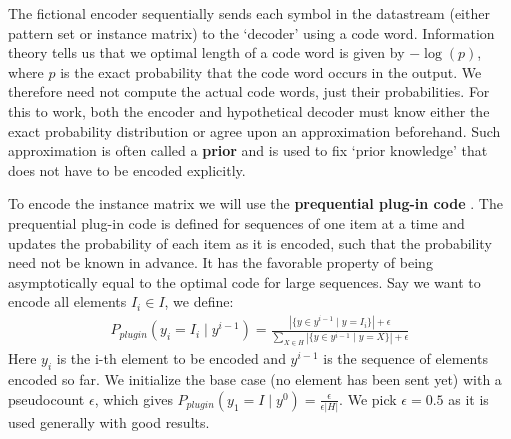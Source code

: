 \documentclass{llncs}
\begin{document}

The fictional encoder sequentially sends each symbol in the datastream (either pattern set or instance matrix) to the `decoder' using a code word. Information theory tells us that we optimal length of a code word is given by $-\log(p)$, where $p$ is the exact probability that the code word occurs in the output. We therefore need not compute the actual code words, just their probabilities. For this to work, both the encoder and hypothetical decoder must know either the exact probability distribution or agree upon an approximation beforehand. Such approximation is often called a \textbf{prior} and is used to fix `prior knowledge' that does not have to be encoded explicitly. 


To encode the instance matrix we will use the \textbf{prequential plug-in code} \cite{ppcode}. The prequential plug-in code is defined for sequences of one item at a time and updates the probability of each item as it is encoded, such that the probability need not be known in advance. It has the favorable property of being asymptotically equal to the optimal code for large sequences. Say we want to encode all elements ${I}_i \in {I}$, we define:
\label{plugin}
\begin{align*}
P_{plugin}( y_i = {I}_i \mid y^{i-1} ) = \frac{|\{y \in y^{i-1} \mid y = {I}_i\}| + \epsilon }{\sum_{X \in H}|\{y \in y^{i-1} \mid y = X\}| + \epsilon}
\end{align*}
Here $y_i$ is the i-th element to be encoded and $y^{i-1}$ is the sequence of elements encoded so far. We initialize the base case (no element has been sent yet) with a pseudocount $\epsilon$, which gives $P_{plugin}( y_1 = {I} \mid y^{0} ) = \frac{\epsilon}{\epsilon|H|}$. We pick $\epsilon=0.5$ as it is used generally with good results.
\end{document}
